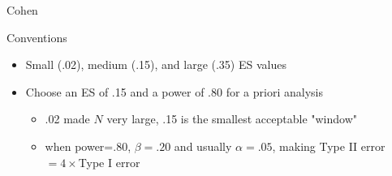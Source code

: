 \begin{frame}{Cohen}
\begin{block}{Conventions}
				\begin{itemize}
					\item Small (.02), medium (.15), and large (.35) ES values 
					\item Choose an ES of .15 and a power of .80 for a priori analysis 
					\begin{itemize}
						\item .02 made $N$ very large, .15 is the smallest acceptable "window"
						\item when power=.80, $\beta=.20$ and usually $\alpha=.05$, making Type II error $ = 4 \times $Type I error
					\end{itemize}
				\end{itemize}
			\end{block}
\end{frame}